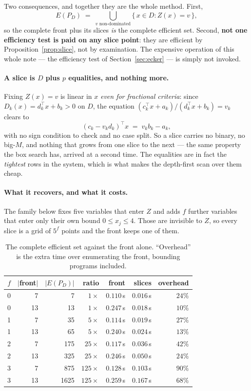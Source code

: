 \documentclass[11pt,a4paper]{article}
\newcommand{\Z}{Z}
\newcommand{\Dset}{D}
\newcommand{\E}{E(P_{\Dset})}
\begin{document}
\noindent
Two consequences, and together they are the whole method.  First,
\[
  \E \;=\; \bigcup_{v \text{ non-dominated}}
                \{\, x \in \Dset : \Z(x) = v \,\},
\]
so the complete front plus its slices \emph{is} the complete efficient set.
Second, \textbf{not one efficiency test is paid on any slice point}: they are
efficient by Proposition~\ref{prop:slice}, not by examination.  The expensive
operation of this whole note --- the efficiency test of Section~\ref{sec:ecker} --- is
simply not invoked.

\paragraph{A slice is $\Dset$ plus $p$ equalities, and nothing more.}  Fixing
$\Z(x) = v$ is linear in $x$ \emph{even for fractional criteria}: since
$D_k(x) = d_k^{\top}x + b_k > 0$ on $\Dset$, the equation
$(c_k^{\top}x + a_k)/(d_k^{\top}x + b_k) = v_k$ clears to
\[
  (c_k - v_k d_k)^{\top} x \;=\; v_k b_k - a_k ,
\]
with no sign condition to check and no case split.  So a slice carries no
binary, no big-$M$, and nothing that grows from one slice to the next --- the
same property the box search has, arrived at a second time.  The equalities are
in fact the \emph{tightest} rows in the system, which is what makes the
depth-first scan over them cheap.

\paragraph{What it recovers, and what it costs.}  The family below fixes five
variables that enter $\Z$ and adds $f$ further variables that enter only their
own bound $0 \leqslant x_j \leqslant 4$.  Those are invisible to $\Z$, so every
slice is a grid of $5^{f}$ points and the front keeps one of them.

\begin{table}[h]
\centering
\caption{The complete efficient set against the front alone.  ``Overhead'' is
the extra time over enumerating the front, bounding programs included.}
\begin{tabular}{rrrrrrr}
\toprule
$f$ & $|$front$|$ & $|\E|$ & ratio & front & slices & overhead \\
\midrule
0 &  7 &     7 & $1\times$   & $0.110$\,s & $0.016$\,s & $24\%$ \\
0 & 13 &    13 & $1\times$   & $0.247$\,s & $0.018$\,s & $10\%$ \\
1 &  7 &    35 & $5\times$   & $0.114$\,s & $0.019$\,s & $27\%$ \\
1 & 13 &    65 & $5\times$   & $0.240$\,s & $0.024$\,s & $13\%$ \\
2 &  7 &   175 & $25\times$  & $0.117$\,s & $0.036$\,s & $42\%$ \\
2 & 13 &   325 & $25\times$  & $0.246$\,s & $0.050$\,s & $24\%$ \\
3 &  7 &   875 & $125\times$ & $0.128$\,s & $0.103$\,s & $90\%$ \\
3 & 13 &  1625 & $125\times$ & $0.259$\,s & $0.167$\,s & $68\%$ \\
\bottomrule
\end{tabular}
\end{table}
\end{document}
